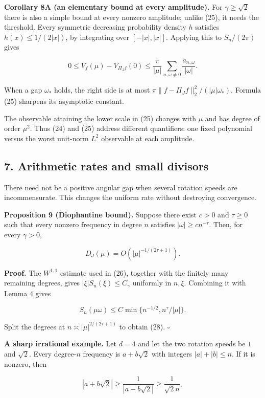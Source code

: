 \documentclass[
  british,
  11pt,
  a4paper,
]{article}
\begin{document}
\textbf{Corollary 8A (an elementary bound at every amplitude).} For
\(\gamma\ge\sqrt2\) there is also a simple bound at every nonzero
amplitude; unlike (25), it needs the threshold. Every symmetric
decreasing probability density \(h\) satisfies \(h(x)\le1/(2|x|)\), by
integrating over \([-|x|,|x|]\). Applying this to \(S_n/(2\pi)\) gives

\[
0\le V_f(\mu)-V_{\Pi_Jf}(0)
\le\frac{\pi}{|\mu|}
\sum_{n,\omega\ne0}\frac{a_{n,\omega}}{|\omega|}. \tag{27}
\]

When a gap \(\omega_*\) holds, the right side is at most
\(\pi\|f-\Pi_Jf\|_2^2/(|\mu|\omega_*)\). Formula (25) sharpens its
asymptotic constant.

The observable attaining the lower scale in (25) changes with \(\mu\)
and has degree of order \(\mu^2\). Thus (24) and (25) address different
quantifiers: one fixed polynomial versus the worst unit-norm \(L^2\)
observable at each amplitude.

\subsection{7. Arithmetic rates and small
divisors}\label{arithmetic-rates-and-small-divisors}

There need not be a positive angular gap when several rotation speeds
are incommensurate. This changes the uniform rate without destroying
convergence.

\textbf{Proposition 9 (Diophantine bound).} Suppose there exist \(c>0\)
and \(\tau\ge0\) such that every nonzero frequency in degree \(n\)
satisfies \(|\omega|\ge c n^{-\tau}\). Then, for every \(\gamma>0\),

\[
D_J(\mu)=O(|\mu|^{-1/(2\tau+1)}). \tag{28}
\]

\textbf{Proof.} The \(W^{1,1}\) estimate used in (26), together with the
finitely many remaining degrees, gives \(|\xi|S_n(\xi)\le C_\gamma\)
uniformly in \(n,\xi\). Combining it with Lemma 4 gives

\[
S_n(\mu\omega)\le C\min\{n^{-1/2},n^\tau/|\mu|\}.
\]

Split the degrees at \(n\asymp|\mu|^{2/(2\tau+1)}\) to obtain (28).
\(\square\)

\textbf{A sharp irrational example.} Let \(d=4\) and let the two
rotation speeds be \(1\) and \(\sqrt2\). Every degree-\(n\) frequency is
\(a+b\sqrt2\) with integers \(|a|+|b|\le n\). If it is nonzero, then

\[
|a+b\sqrt2|\ge\frac1{|a-b\sqrt2|}\ge\frac1{\sqrt2 n},
\]
\end{document}
